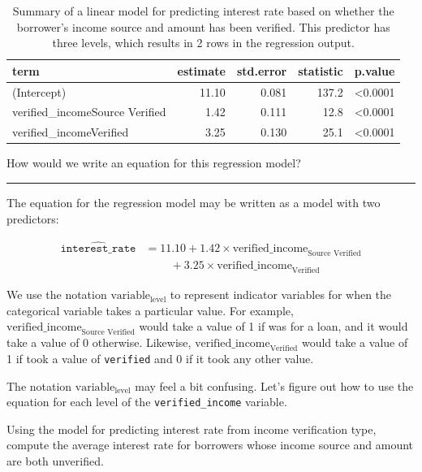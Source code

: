 \documentclass[
  10pt,
  openany]{book}
\theoremstyle{definition}
\theoremstyle{definition}
\theoremstyle{definition}
\theoremstyle{definition}
\theoremstyle{remark}
\begin{document}
\begin{table}
\centering
\caption{\label{tab:intRateVsVerIncomeModel}Summary of a linear model for predicting interest rate based on whether the borrower’s income source and amount has been verified. This predictor has three levels, which results in 2 rows in the regression output.}
\centering
\begin{tabular}[t]{l|r|r|r|l}
\hline
term & estimate & std.error & statistic & p.value\\
\hline
(Intercept) & 11.10 & 0.081 & 137.2 & <0.0001\\
\hline
verified\_incomeSource Verified & 1.42 & 0.111 & 12.8 & <0.0001\\
\hline
verified\_incomeVerified & 3.25 & 0.130 & 25.1 & <0.0001\\
\hline
\end{tabular}
\end{table}

How would we write an equation for this regression model?

\begin{center}\rule{0.5\linewidth}{0.5pt}\end{center}

The equation for the regression model may be written as a model with two predictors:

\begin{align*}
\widehat{\texttt{interest_rate}} &= 11.10 + 1.42 \times \text{verified_income}_{\text{Source Verified}}\\
&\qquad\ + 3.25 \times \text{verified_income}_{\text{Verified}}
\end{align*}

We use the notation \(\text{variable}_{\text{level}}\) to represent indicator variables for when the categorical variable takes a particular value.
For example, \(\text{verified_income}_{\text{Source Verified}}\) would take a value of 1 if
was for a loan, and it would take a value of 0 otherwise.
Likewise, \(\text{verified_income}_{\text{Verified}}\) would take a value of 1 if took a
value of \texttt{verified} and 0 if it took any other value.

The notation \(\text{variable}_{\text{level}}\) may feel a bit confusing.
Let's figure out how to use the equation for each level of the \texttt{verified\_income} variable.

Using the model for predicting interest rate from income verification type, compute the average interest rate for borrowers whose income source and amount are both unverified.
\end{document}
